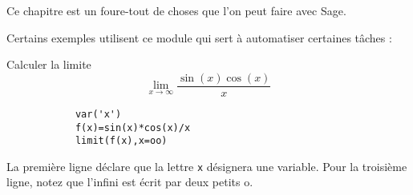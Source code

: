 
Ce chapitre est un foure-tout de choses que l'on peut faire avec Sage.

Certains exemples utilisent ce module qui sert à automatiser certaines tâches : 



\begin{example}     \label{ExBCRXooDVUdcf}
	Calculer la limite 
			\begin{equation}
				\lim_{x\to\infty}\frac{ \sin(x)\cos(x) }{ x }
			\end{equation}


            \begin{verbatim}
			var('x')
			f(x)=sin(x)*cos(x)/x
			limit(f(x),x=oo)
            \end{verbatim}
	La première ligne déclare que la lettre \texttt{x} désignera une variable. Pour la troisième ligne, notez que l'infini est écrit par deux petits \og o\fg.
\end{example}

